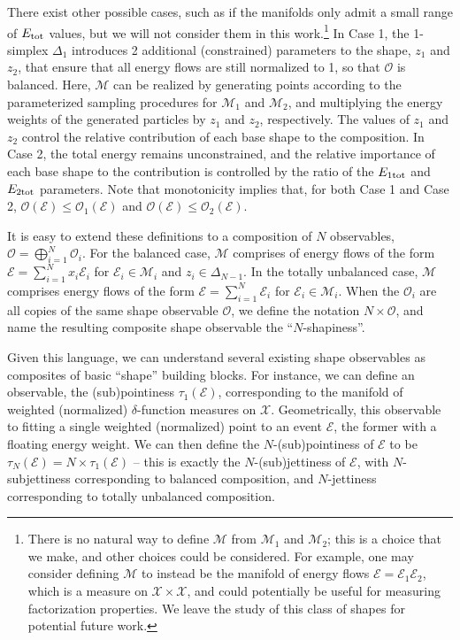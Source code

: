 \documentclass[letterpaper,11pt]{article}
\newcommand{\E}{\mathcal{E}}
\newcommand{\M}{\mathcal{M}}
\begin{document}
There exist other possible cases, such as if the manifolds only admit a small range of $E_{\rm tot}$ values, but we will not consider them in this work.\footnote{There is no natural way to define $\M$ from $\M_1$ and $\M_2$; this is a choice that we make, and other choices could be considered. For example, one may consider defining $\M$ to instead be the manifold of energy flows $\E = \E_1 \E_2$, which is a measure on $\mathcal{X}\times\mathcal{X}$, and could potentially be useful for measuring factorization properties. We leave the study of this class of shapes for potential future work.} In Case 1, the 1-simplex $\Delta_1$ introduces 2 additional (constrained) parameters to the shape, $z_1$ and $z_2$, that ensure that all energy flows are still normalized to 1, so that $\mathcal{O}$ is balanced. Here, $\M$ can be realized by generating points according to the parameterized sampling procedures for $\M_1$ and $\M_2$, and multiplying the energy weights of the generated particles by $z_1$ and $z_2$, respectively. The values of $z_1$ and $z_2$ control the relative contribution of each base shape to the composition. In Case 2, the total energy remains unconstrained, and the relative importance of each base shape to the contribution is controlled by the ratio of the $E_{1 \rm tot}$ and $E_{2 \rm tot}$ parameters. Note that monotonicity implies that, for both Case 1 and Case 2, $\mathcal{O}(\E) \leq \mathcal{O}_1(\E)$ and $\mathcal{O}(\E) \leq \mathcal{O}_2(\E)$. 

It is easy to extend these definitions to a composition of $N$ observables, $\mathcal{O} = \bigoplus_{i=1}^N \mathcal{O}_i$. For the balanced case, $\M$ comprises of energy flows of the form $\E = \sum_{i = 1}^N x_i \E_i$ for $\E_i \in \M_i$ and $z_i \in \Delta_{N-1}$. In the totally unbalanced case, $\M$ comprises energy flows of the form $\E = \sum_{i = 1}^N \E_i$ for $\E_i \in \M_i$. When the $\mathcal{O}_i$ are all copies of the same shape observable $\mathcal{O}$, we define the notation $N\times\mathcal{O}$, and name the resulting composite shape observable the ``$N$-shapiness''.


Given this language, we can understand several existing shape observables as composites of basic ``shape'' building blocks. For instance, we can define an observable, the (sub)pointiness $\tau_1(\E)$, corresponding to the manifold of weighted (normalized) $\delta$-function measures on $\mathcal{X}$. Geometrically, this observable to fitting a single weighted (normalized) point to an event $\E$, the former with a floating energy weight. We can then define the $N$-(sub)pointiness of $\E$ to be $\tau_N(\E) = N \times \tau_1(\E)$ -- this is exactly the $N$-(sub)jettiness of $\E$, with $N$-subjettiness corresponding to balanced composition, and $N$-jettiness corresponding to totally unbalanced composition.
\end{document}
